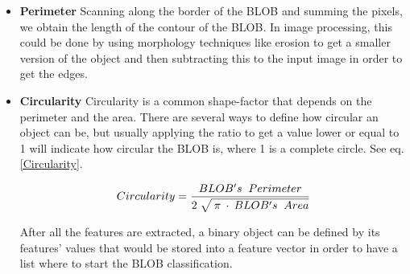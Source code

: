 {\begin{itemize}
\item \textbf{Perimeter}
Scanning along the border of the BLOB and summing the pixels, we obtain the length of the contour of the BLOB. In image processing, this could be done by using morphology techniques like erosion to get a smaller version of the object and then subtracting this to the input image in order to get the edges.
\item \textbf{Circularity}
Circularity is a common shape-factor that depends on the perimeter and the area. There are several ways to define how circular an object can be, but usually applying the ratio to get a value lower or equal to 1 will indicate how circular the BLOB is, where 1 is a complete circle. See eq. \ref{Circularity}.


\begin{equation}	
	\begin{aligned}
	{Circularity}=\displaystyle\frac{BLOB's \;\; Perimeter}{2 \; \sqrt{\mathstrut \: \pi \: \cdot \: {BLOB's \;\; Area}}}
	\label{Circularity}
	\end{aligned}
\end{equation}


After all the features are extracted, a binary object can be defined by its features' values that would be stored into a feature vector in order to have a list where to start the BLOB classification.
\end{itemize}


}
